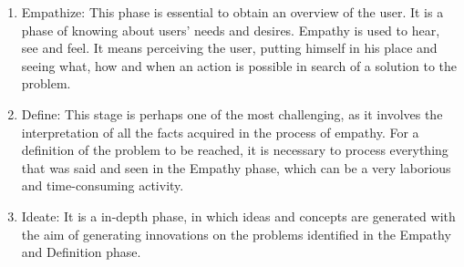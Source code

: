 \documentclass[conference]{IEEEtran}
\begin{document}
\begin{enumerate}


\item Empathize: This phase is essential to obtain an overview of the user. It is a phase of knowing about users' needs and desires. Empathy is used to hear, see and feel. It means perceiving the user, putting himself in his place and seeing what, how and when an action is possible in search of a solution to the problem.


\item Define: This stage is perhaps one of the most challenging, as it involves the interpretation of all the facts acquired in the process of empathy. For a definition of the problem to be reached, it is necessary to process everything that was said and seen in the Empathy phase, which can be a very laborious and time-consuming activity.


\item Ideate: It is a in-depth phase, in which ideas and concepts are generated with the aim of generating innovations on the problems identified in the Empathy and Definition phase.



\end{enumerate}
\end{document}
